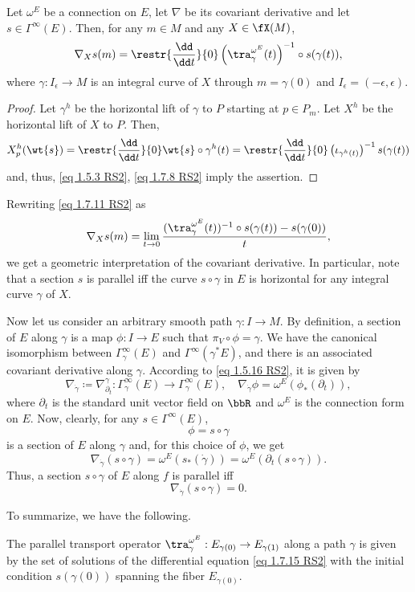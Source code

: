 \begin{prop}[{{\cite[Prop.~1.7.17]{RS2}}}]\label{prop 1.7.17 RS2}
    Let $\omega^E$ be a connection on $E$, let $\nabla$ be its covariant derivative and let $s\in\Gamma^\infty(E)$. Then, for any $m\in M$ and any $X\in\fX(M)$,
    \[\nabla_X s(m)=\restr{\frac{\dd}{\dd t}}{0}\left(\tra_\gamma^{\omega^E}(t)\right)^{-1}\circ s(\gamma(t)),\label{eq 1.7.11 RS2}\]
    where $\gamma:I_\epsilon\to M$ is an integral curve of $X$ through $m=\gamma(0)$ and $I_\epsilon=(-\epsilon,\epsilon)$.
\end{prop}
\begin{proof}
    Let $\gamma^h$ be the horizontal lift of $\gamma$ to $P$ starting at $p\in P_m$. Let $X^h$ be the horizontal lift of $X$ to $P$. Then,
    \[X_p^h(\wt{s})=\restr{\frac{\dd}{\dd t}}{0}\wt{s}\circ \gamma^h(t)=\restr{\frac{\dd}{\dd t}}{0}\left(\iota_{\gamma^h(t)}\right)^{-1}s(\gamma(t))\]
    and, thus, \eqref{eq 1.5.3 RS2}, \eqref{eq 1.7.8 RS2} imply the assertion.
\end{proof}
Rewriting \eqref{eq 1.7.11 RS2} as
\[\nabla_X s(m)=\lim_{t\to 0}\frac{(\tra_{\gamma}^{\omega^E}(t))^{-1}\circ s(\gamma(t))-s(\gamma(0))}{t},\]
we get a geometric interpretation of the covariant derivative. In particular, note that a section $s$ is parallel iff the curve $s\circ \gamma$ in $E$ is horizontal for any integral curve $\gamma$ of $X$.

Now let us consider an arbitrary smooth path $\gamma:I\to M$. By definition, a section of $E$ along $\gamma$ is a map $\phi:I\to E$ such that $\pi_V\circ \phi=\gamma$. We have the canonical isomorphism between $\Gamma_\gamma^\infty(E)$ and $\Gamma^\infty(\gamma^\ast E)$, and there is an associated covariant derivative along $\gamma$. According to \eqref{eq 1.5.16 RS2}, it is given by
\[\nabla_{\dot\gamma}\coloneqq \nabla^\gamma_{\partial_t}:\Gamma^\infty_\gamma(E)\to \Gamma^\infty_\gamma(E),\quad \nabla_{\dot\gamma}\phi=\omega^E\left(\phi_\ast(\partial_t)\right),\label{eq 1.7.13 RS2}\]
where $\partial_t$ is the standard unit vector field on $\bbR$ and $\omega^E$ is the connection form on $E$. Now, clearly, for any $s\in\Gamma^\infty(E)$,
\[\phi=s\circ\gamma\]
is a section of $E$ along $\gamma$ and, for this choice of $\phi$, we get
\[\nabla_{\dot\gamma}(s\circ\gamma)=\omega^E(s_\ast(\dot\gamma))=\omega^E(\partial_t(s\circ \gamma)).\label{eq 1.7.14 RS2}\]
Thus, a section $s\circ\gamma$ of $E$ along $f$ is parallel iff
\[\nabla_{\dot\gamma}(s\circ\gamma)=0.\label{eq 1.7.15 RS2}\]

To summarize, we have the following.
\begin{prop}
    The parallel transport operator $\tra_\gamma^{\omega^E}:E_{\gamma(0)}\to E_{\gamma(1)}$ along a path $\gamma$ is given by the set of solutions of the differential equation \eqref{eq 1.7.15 RS2} with the initial condition $s(\gamma(0))$ spanning the fiber $E_{\gamma(0)}$.
\end{prop}

